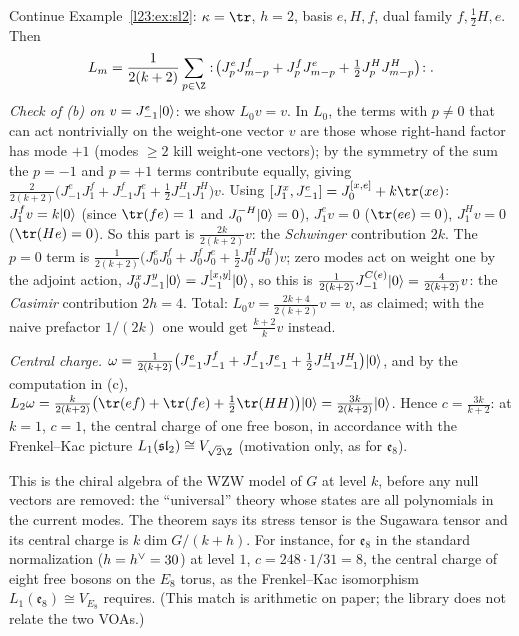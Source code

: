 \begin{example}\label{l23:ex:sl2sug}
Continue Example~\ref{l23:ex:sl2}: $\kappa=\tr$, $h=2$, basis $e,H,f$, dual family $f,\tfrac12H,e$. Then
\begin{equation*}
L_m=\frac{1}{2(k+2)}\sum_{p\in\Z}:\!\big(J^e_pJ^f_{m-p}+J^f_pJ^e_{m-p}+\tfrac12J^H_pJ^H_{m-p}\big)\!: .
\end{equation*}
\emph{Check of (b) on $v=J^e_{-1}|0\rangle$}: we show $L_0v=v$. In $L_0$, the terms with $p\neq0$ that can act nontrivially on the
weight-one vector $v$ are those whose right-hand factor has mode $+1$ (modes $\ge2$ kill weight-one vectors); by the symmetry of the sum
the $p=-1$ and $p=+1$ terms contribute equally, giving
$\frac{2}{2(k+2)}\big(J^e_{-1}J^f_1+J^f_{-1}J^e_1+\tfrac12J^H_{-1}J^H_1\big)v$. Using $[J^x_1,J^e_{-1}]=J^{[x,e]}_0+k\tr(xe)$:
$J^f_1v=k|0\rangle$ (since $\tr(fe)=1$ and $J^{-H}_0|0\rangle=0$), $J^e_1v=0$ ($\tr(ee)=0$), $J^H_1v=0$ ($\tr(He)=0$). So this part is
$\frac{2k}{2(k+2)}v$: the \emph{Schwinger} contribution $2k$. The $p=0$ term is
$\frac1{2(k+2)}\big(J^e_0J^f_0+J^f_0J^e_0+\tfrac12J^H_0J^H_0\big)v$; zero modes act on weight one by the adjoint action,
$J^x_0J^y_{-1}|0\rangle=J^{[x,y]}_{-1}|0\rangle$, so this is $\frac1{2(k+2)}J^{C(e)}_{-1}|0\rangle=\frac{4}{2(k+2)}v$: the
\emph{Casimir} contribution $2h=4$. Total: $L_0v=\frac{2k+4}{2(k+2)}v=v$, as claimed; with the naive prefactor $1/(2k)$ one would get
$\frac{k+2}{k}v$ instead.

\emph{Central charge.} $\omega=\frac1{2(k+2)}\big(J^e_{-1}J^f_{-1}+J^f_{-1}J^e_{-1}+\tfrac12J^H_{-1}J^H_{-1}\big)|0\rangle$, and by the
computation in (c), $L_2\omega=\frac{k}{2(k+2)}\big(\tr(ef)+\tr(fe)+\tfrac12\tr(HH)\big)\lxxiiivac=\frac{3k}{2(k+2)}\lxxiiivac$. Hence
$c=\frac{3k}{k+2}$: at $k=1$, $c=1$, the central charge of one free boson, in accordance with the Frenkel--Kac picture
$L_1(\mathfrak{sl}_2)\cong V_{\sqrt2\Z}$ (motivation only, as for $\mathfrak e_8$).
\end{example}

\begin{physics}
This is the chiral algebra of the WZW model of $G$ at level $k$, before any null vectors are removed: the ``universal''
theory whose states are all polynomials in the current modes. The theorem says its stress tensor is the Sugawara tensor
and its central charge is $k\dim G/(k+h)$. For instance, for $\mathfrak e_8$ in the standard normalization ($h=h^\vee=30$)
at level $1$, $c=248\cdot1/31=8$, the central charge of eight free bosons on the $E_8$ torus, as the Frenkel--Kac
isomorphism $L_1(\mathfrak e_8)\cong V_{E_8}$ requires. (This match is arithmetic on paper; the library does not relate the two VOAs.)
\end{physics}

